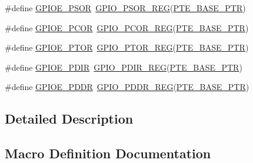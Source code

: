 \begin{DoxyCompactItemize}
\item 
\#define \hyperlink{group___g_p_i_o___register___accessor___macros_gab91dcbd2c6ae1b33cc222433e6c0d2a5}{G\+P\+I\+O\+E\+\_\+\+P\+S\+OR}~\hyperlink{group___g_p_i_o___register___accessor___macros_ga05da33b22ee087558800c07d743c52e7}{G\+P\+I\+O\+\_\+\+P\+S\+O\+R\+\_\+\+R\+EG}(\hyperlink{group___g_p_i_o___peripheral_gaa230685f72ad1540850ab8d12366775c}{P\+T\+E\+\_\+\+B\+A\+S\+E\+\_\+\+P\+TR})
\item 
\#define \hyperlink{group___g_p_i_o___register___accessor___macros_gae47e95a0795236c55495e95b67dc6540}{G\+P\+I\+O\+E\+\_\+\+P\+C\+OR}~\hyperlink{group___g_p_i_o___register___accessor___macros_gafeabd0beb942930229271934efc513ef}{G\+P\+I\+O\+\_\+\+P\+C\+O\+R\+\_\+\+R\+EG}(\hyperlink{group___g_p_i_o___peripheral_gaa230685f72ad1540850ab8d12366775c}{P\+T\+E\+\_\+\+B\+A\+S\+E\+\_\+\+P\+TR})
\item 
\#define \hyperlink{group___g_p_i_o___register___accessor___macros_ga0d6201794a479eb4530b4deedf9f7471}{G\+P\+I\+O\+E\+\_\+\+P\+T\+OR}~\hyperlink{group___g_p_i_o___register___accessor___macros_ga4c1b943d4d92f73c9f08d272d8fc8fe1}{G\+P\+I\+O\+\_\+\+P\+T\+O\+R\+\_\+\+R\+EG}(\hyperlink{group___g_p_i_o___peripheral_gaa230685f72ad1540850ab8d12366775c}{P\+T\+E\+\_\+\+B\+A\+S\+E\+\_\+\+P\+TR})
\item 
\#define \hyperlink{group___g_p_i_o___register___accessor___macros_gab12c5a1580446153a220ff5fadf052bd}{G\+P\+I\+O\+E\+\_\+\+P\+D\+IR}~\hyperlink{group___g_p_i_o___register___accessor___macros_gac2c9f15f5083562b4f7c2826afe2d2b6}{G\+P\+I\+O\+\_\+\+P\+D\+I\+R\+\_\+\+R\+EG}(\hyperlink{group___g_p_i_o___peripheral_gaa230685f72ad1540850ab8d12366775c}{P\+T\+E\+\_\+\+B\+A\+S\+E\+\_\+\+P\+TR})
\item 
\#define \hyperlink{group___g_p_i_o___register___accessor___macros_ga4ca5e050e0a711260b6d4dd0d3eabe76}{G\+P\+I\+O\+E\+\_\+\+P\+D\+DR}~\hyperlink{group___g_p_i_o___register___accessor___macros_ga059c8153363c15c02fbf13c0de04298d}{G\+P\+I\+O\+\_\+\+P\+D\+D\+R\+\_\+\+R\+EG}(\hyperlink{group___g_p_i_o___peripheral_gaa230685f72ad1540850ab8d12366775c}{P\+T\+E\+\_\+\+B\+A\+S\+E\+\_\+\+P\+TR})
\end{DoxyCompactItemize}


\subsection{Detailed Description}


\subsection{Macro Definition Documentation}
